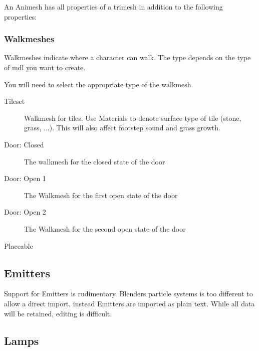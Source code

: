 An Animesh has all properties of a trimesh in addition to the following
properties:

\subsubsection{Walkmeshes}
Walkmeshes indicate where a character can walk. The type depends on the type
of mdl you want to create.

You will need to select the appropriate type of the walkmesh.
\begin{description}
    \item[Tileset] Walkmesh for tiles. Use Materials to denote surface type of
                   tile (stone, grass, ...). This will also affect footstep
                   sound and grass growth.
    \item[Door: Closed] The walkmesh for the closed state of the door
    \item[Door: Open 1] The Walkmesh for the first open state of the door
    \item[Door: Open 2] The Walkmesh for the second open state of the door
    \item[Placeable]
\end{description}

\subsection{Emitters}
Support for Emitters is rudimentary. Blenders particle systems is too
different to allow a direct import, instead Emitters are imported as plain
text. While all data will be retained, editing is difficult.

\subsection{Lamps}
